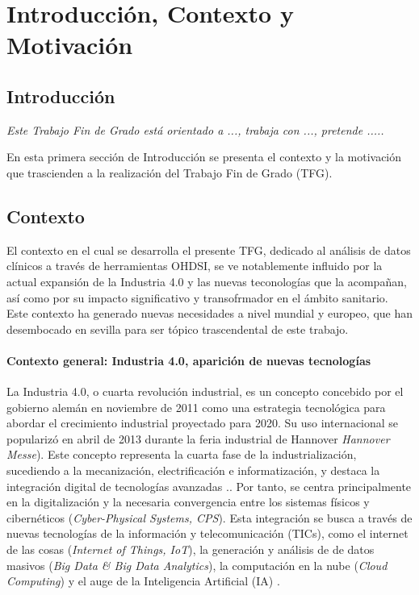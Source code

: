 \chapter{Introducción, Contexto y Motivación}\label{cap:introduccion}


\section{Introducción}

\textit{Este Trabajo Fin de Grado está orientado a ..., trabaja con ..., pretende .....}

En esta primera sección de Introducción se presenta el contexto y la motivación que trascienden a la realización del Trabajo Fin de Grado (TFG).



\section{Contexto}
 
El contexto en el cual se desarrolla el presente TFG, dedicado al análisis de datos clínicos a través de herramientas OHDSI, se ve notablemente influido por la actual expansión de la Industria 4.0 y las nuevas teconologías que la acompañan, así como por su impacto significativo y transofrmador en el ámbito sanitario. Este contexto ha generado nuevas necesidades a nivel mundial y europeo, que han desembocado en sevilla para ser tópico trascendental de este trabajo.


\subsubsection{Contexto general: Industria 4.0, aparición de nuevas tecnologías}

La Industria 4.0, o cuarta revolución industrial, es un concepto concebido por el gobierno alemán en noviembre de 2011 como una estrategia tecnológica para abordar el crecimiento industrial proyectado para 2020. Su uso internacional se popularizó en abril de 2013 durante la feria industrial de Hannover \textit{Hannover Messe}). Este concepto representa la cuarta fase de la industrialización, sucediendo a la mecanización, electrificación e informatización, y destaca la integración digital de tecnologías avanzadas \cite{lasi2014industry}..
Por tanto, se centra principalmente en la digitalización y la necesaria convergencia entre los sistemas físicos y cibernéticos (\textit{Cyber-Physical Systems, CPS}). Esta integración se busca a través de nuevas tecnologías de la información y telecomunicación (TICs), como el internet de las cosas (\textit{Internet of Things, IoT}), la generación y análisis de de datos masivos (\textit{Big Data \& Big Data Analytics}), la computación en la nube (\textit{Cloud Computing}) y el auge de la Inteligencia Artificial (IA) \cite{lasi2014industry}.\cite{chen2020times}\cite{tortorella2020healthcare}


